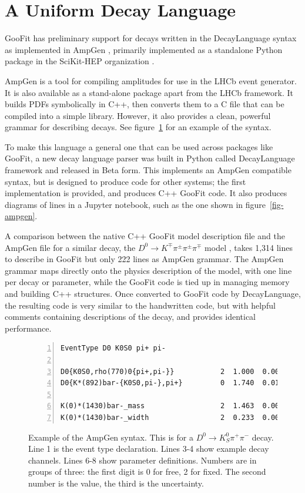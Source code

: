 \documentclass{webofc}
\begin{document}
\section{A Uniform Decay Language}
\label{sec-ampgen}

GooFit has preliminary support for decays written in the DecayLanguage syntax as implemented in AmpGen \cite{lib:AmpGen}, primarily implemented as a standalone Python package in the SciKit-HEP organization \cite{org:scikithep}.

AmpGen is a tool for compiling amplitudes for use in the LHCb event generator. It is also available as a stand-alone package apart from the LHCb framework. It builds PDFs symbolically in C++, then converts them to a C file that can be compiled into a simple library. However, it also provides a clean, powerful grammar for describing decays. See figure~\ref{fig-ampgencode} for an example of the syntax.

To make this language a general one that can be used across packages like GooFit, a new decay language parser was built in Python called DecayLanguage framework and released in Beta form. This implements an AmpGen compatible syntax, but is designed to produce code for other systems; the first implementation is provided, and produces C++ GooFit code. It also produces diagrams of lines in a Jupyter notebook, such as the one shown in figure~\ref{fig-ampgen}.

A comparison between the native C++ GooFit model description file and the AmpGen file for a similar decay, the  $D^0\rightarrow K^{\mp} \pi^{\pm} \pi^{\pm} \pi^{\mp}$ model \cite{paper:kthreepi}, takes 1,314 lines to describe in GooFit but only 222 lines as AmpGen grammar. The AmpGen grammar maps directly onto the physics description of the model, with one line per decay or parameter, while the GooFit code is tied up in managing memory and building C++ structures. Once converted to GooFit code by DecayLanguage, the resulting code is very similar to the handwritten code, but with helpful comments containing descriptions of the decay, and provides identical performance.

\begin{figure}[h]
\begin{lstlisting}[numbers=left]
EventType D0 K0S0 pi+ pi-

D0{K0S0,rho(770)0{pi+,pi-}}           2  1.000  0.00  2     0.0 0.0
D0{K*(892)bar-{K0S0,pi-},pi+}         0  1.740  0.01  0   139.0 0.3

K(0)*(1430)bar-_mass                  2  1.463  0.002
K(0)*(1430)bar-_width                 2  0.233  0.005
\end{lstlisting}
    \caption{Example of the AmpGen syntax. This is for a $D^0 \rightarrow K_S^0 \pi^+ \pi^-$ decay. Line 1 is the event type declaration. Lines 3-4 show example decay channels. Lines 6-8 show parameter definitions. Numbers are in groups of three: the first digit is 0 for free, 2 for fixed. The second number is the value, the third is the uncertainty.}
\label{fig-ampgencode}
\end{figure}
\end{document}
